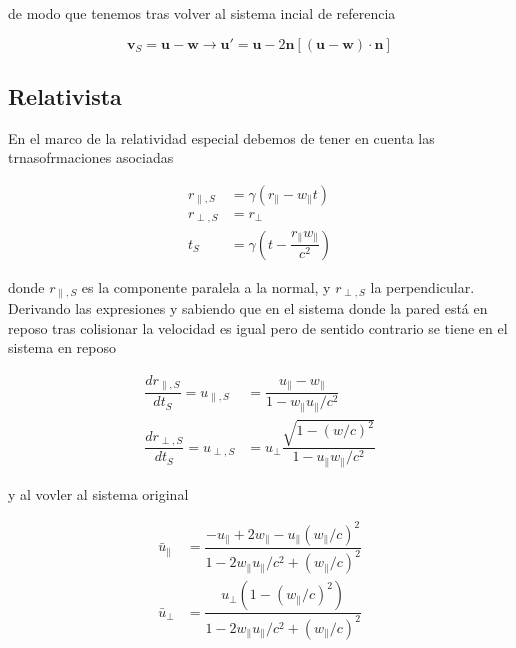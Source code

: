 \documentclass[11pt, spanish]{article}
\begin{document}
de modo que tenemos tras volver al sistema incial de referencia

\begin{equation}
    \mathbf{v}_S = \mathbf{u} - \mathbf{w} \longrightarrow \mathbf{u}' = \mathbf{u} - 2\mathbf{n}\left[(\mathbf{u} - \mathbf{w}) \cdot \mathbf{n}\right]
\end{equation}

\subsection{Relativista}

En el marco de la relatividad especial debemos de tener en cuenta las trnasofrmaciones asociadas 

\begin{align}\label{eq:transformacion_2d}
    r_{\parallel,S} &= \gamma\left( r_\parallel - w_\parallel t \right) \nonumber\\
    r_{\perp, S} &= r_\perp  \\
    t_S &= \gamma\left( t - \dfrac{r_\parallel w_\parallel}{c^2} \right) \nonumber
\end{align}

donde \( r_{\parallel,S}\) es la componente paralela a la normal, y \(  r_{\perp, S} \) la perpendicular. Derivando las expresiones y sabiendo que en el sistema donde la pared está en reposo tras colisionar la velocidad es igual pero de sentido contrario se tiene en el sistema en reposo

\begin{align}
    \dfrac{dr_{\parallel, S}}{dt_S} = u_{\parallel,S} &= \dfrac{u_\parallel - w_\parallel}{1 - w_\parallel u_\parallel / c^2} \label{eq:velocity_change1}\\[2mm]
    \dfrac{dr_{\perp, S}}{dt_S} = u_{\perp,S} &= u_\perp\dfrac{\sqrt{1 - {(w/c)}^2}}{1 - u_\parallel w_\parallel / c^2} \label{eq:velocity_change2}
\end{align}

y al vovler al sistema original 

\begin{align}
    \bar{u}_\parallel &= \dfrac{-u_\parallel + 2w_\parallel - u_\parallel(w_\parallel/c)^2}{1 - 2w_\parallel u_\parallel / c^2 + (w_\parallel/c)^2} \label{eq:velocidad_paralela}\\[2mm]
    \bar{u}_\perp &= \dfrac{u_\perp\left(1 - (w_\parallel/c)^2\right)}{1 - 2w_\parallel u_\parallel / c^2 + (w_\parallel/c)^2}\label{eq:velocidad_perpendicular}
\end{align}
\end{document}

